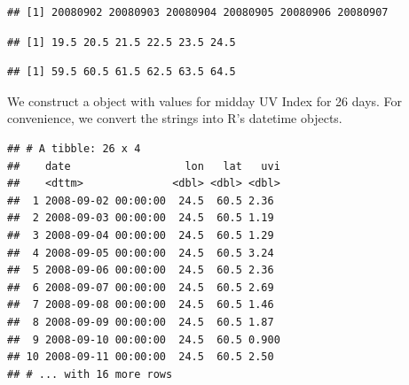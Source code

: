 \documentclass[krantz2,ChapterTOCs]{krantz}\usepackage{knitr}
\begin{document}
\begin{knitrout}\footnotesize
{}\color{fgcolor}\begin{kframe}
\begin{alltt}
 \hlkwb{<-}  \hlstd{)}
\end{alltt}
\begin{verbatim}
## [1] 20080902 20080903 20080904 20080905 20080906 20080907
\end{verbatim}
\begin{alltt}
 \hlkwb{<-}   \hlstd{)}
\end{alltt}
\begin{verbatim}
## [1] 19.5 20.5 21.5 22.5 23.5 24.5
\end{verbatim}
\begin{alltt}
 \hlkwb{<-}   \hlstd{)}
\end{alltt}
\begin{verbatim}
## [1] 59.5 60.5 61.5 62.5 63.5 64.5
\end{verbatim}
\end{kframe}
\end{knitrout}

We construct a  object with values for midday UV Index for 26 days. For convenience, we convert the strings into R's datetime objects.

\begin{knitrout}\footnotesize
{}\color{fgcolor}\begin{kframe}
\begin{alltt}
 \hlkwb{<-}
    \hlstd{(} \hlstd{=}  \hlstd{=}\hlstd{),}
            \hlstd{= longitude[}\hlstd{],}
            \hlstd{= latitude[}\hlstd{],}
            \hlstd{=}  \hlstd{)[}\hlstd{,}\hlstd{,]}
           \hlstd{)}
\end{alltt}
\begin{verbatim}
## # A tibble: 26 x 4
##    date                  lon   lat   uvi
##    <dttm>              <dbl> <dbl> <dbl>
##  1 2008-09-02 00:00:00  24.5  60.5 2.36 
##  2 2008-09-03 00:00:00  24.5  60.5 1.19 
##  3 2008-09-04 00:00:00  24.5  60.5 1.29 
##  4 2008-09-05 00:00:00  24.5  60.5 3.24 
##  5 2008-09-06 00:00:00  24.5  60.5 2.36 
##  6 2008-09-07 00:00:00  24.5  60.5 2.69 
##  7 2008-09-08 00:00:00  24.5  60.5 1.46 
##  8 2008-09-09 00:00:00  24.5  60.5 1.87 
##  9 2008-09-10 00:00:00  24.5  60.5 0.900
## 10 2008-09-11 00:00:00  24.5  60.5 2.50 
## # ... with 16 more rows
\end{verbatim}
\end{kframe}
\end{knitrout}
\end{document}
